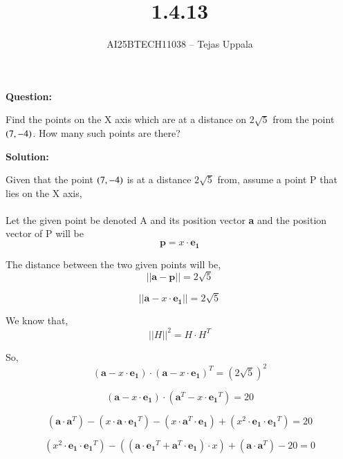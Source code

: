 \documentclass[journal,12pt,onecolumn]{IEEEtran}
\begin{document}
\title{1.4.13}
\author{AI25BTECH11038 -- Tejas Uppala}
{\let\newpage\relax\maketitle}

\textbf{Question:} 

   \noindent Find the points on the X axis which are at a distance on $2 \sqrt{5}$ from the point $\left(7, {-4}\right)$. How many such points are there?

\textbf{Solution:}

   \noindent Given that the point $\left(7, {-4}\right)$ is at a distance $2 \sqrt{5}$ from, assume a point P that lies on the X axis,\\ \\ 
   Let the given point be denoted A and its position vector \textbf{a} and the position vector of P will be 
\begin{equation}
\textbf{p} = x\cdot \mathbf{e_1}
\end{equation}

    \noindent The distance between the two given points will be,
\begin{equation}
||\textbf{a} - \textbf{p}|| = 2 \sqrt{5}
\end{equation}

\begin{equation}
||\textbf{a} - x\cdot \mathbf{e_1} || = 2 \sqrt{5}
\end{equation}

    \noindent We know that, 
\begin{equation}
||H||^2 = H \cdot H^T
\end{equation}

    \noindent So,
\begin{equation}
(\textbf{a} - x\cdot \mathbf{e_1})\cdot (\textbf{a} - x\cdot \mathbf{e_1})^T = (2\sqrt{5})^2
\end{equation}

\begin{equation}
(\textbf{a} - x\cdot \mathbf{e_1})\cdot (\textbf{a}^T - x\cdot \mathbf{e_1}^T) = 20
\end{equation}

\begin{equation}
(\textbf{a}\cdot \textbf{a}^T) - (x\cdot \textbf{a}\cdot \mathbf{e_1}^T) - (x\cdot \textbf{a}^T\cdot \mathbf{e_1}) + (x^2\cdot \mathbf{e_1}\cdot \mathbf{e_1}^T) = 20
\end{equation}

\begin{equation}
(x^2\cdot \mathbf{e_1}\cdot \mathbf{e_1}^T) - ((\textbf{a}\cdot \mathbf{e_1}^T + \textbf{a}^T\cdot \mathbf{e_1} )\cdot x) + (\textbf{a}\cdot \textbf{a}^T) - 20 = 0
\end{equation}
\end{document}
